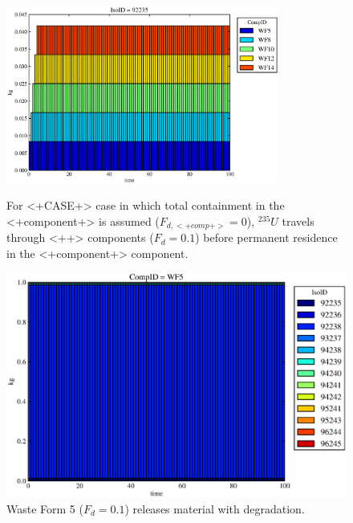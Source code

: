 \begin{figure}[ht]
\centering
\includegraphics[width=0.8\textwidth]{./chapters/demonstration/no_release/lpPFMI.eps}
\caption[$^{235}U$ residence. Lumped Parameter  <+Component+> No Release.]{
For <+CASE+> case in which total containment in the <+component+> is assumed 
($F_{d,<+comp+>}=0$), $^{235}U$ travels through <++> components ($F_d = 0.1$) before 
permanent residence in the <+component+> component.
}
\label{fig:lpPFMIall}
\begin{minipage}[b]{0.45\linewidth}

  \includegraphics[width=\textwidth]{./chapters/demonstration/no_release/lpPFMI1.eps}
  \caption[LPPFMI Waste Form Contaminants.]{
    Waste Form 5 ($F_d = 0.1$) releases material with degradation. 
    }
  \label{fig:lpPFMIwf5}
  

\end{minipage}
\end{figure}
